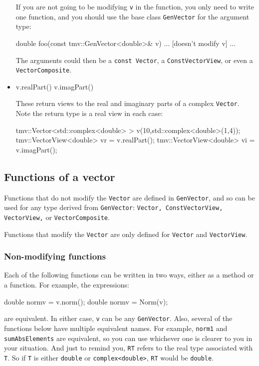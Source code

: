 \documentclass[twoside,letterpaper,11pt]{article}
\renewcommand{\tt}[1]{{\lstinline {#1}}}
\begin{document}
\begin{itemize}
If you are not going to be modifying \tt{v} in the function, you only need to
write one function, and you should use the base class \tt{GenVector} 
for the argument type:
\begin{tmvcode}
double foo(const tmv::GenVector<double>& v)
{ ... [doesn't modify v] ... }
\end{tmvcode}
The arguments could then be a \tt{const Vector}, a \tt{ConstVectorView},
or even a \tt{VectorComposite}.

\item
\begin{tmvcode}
v.realPart()
v.imagPart()
\end{tmvcode}
These return views to the real and imaginary parts of a complex \tt{Vector}.
Note the return type is a real view in each case:
\begin{tmvcode}
tmv::Vector<std::complex<double> > v(10,std::complex<double>(1,4));
tmv::VectorView<double> vr = v.realPart();
tmv::VectorView<double> vi = v.imagPart();
\end{tmvcode}

\end{itemize}

\subsection{Functions of a vector }
\label{vectorfunctions}

Functions that do not modify the \tt{Vector} are defined in 
\tt{GenVector}, and so can be used for any type derived from \tt{GenVector}:
\tt{Vector, ConstVectorView, VectorView,} or \tt{VectorComposite}.

Functions that modify the \tt{Vector} are only defined for 
\tt{Vector} and \tt{VectorView}.

\subsubsection{Non-modifying functions}

Each of the following functions can be written in two ways, either as a method or a function.
For example, the expressions:
\begin{tmvcode}
double normv = v.norm();
double normv = Norm(v);
\end{tmvcode}
are equivalent.  In either case, \tt{v} can be any \tt{GenVector}.
Also, several of the functions below have multiple equivalent names.  For example,
\tt{norm1} and \tt{sumAbsElements} are equivalent, so you can use whichever one is
clearer to you in your situation.
And just to remind you, \tt{RT} refers to the 
real type associated with \tt{T}.  So if \tt{T} is either \tt{double} or \tt{complex<double>},
\tt{RT} would be \tt{double}.
\end{document}
